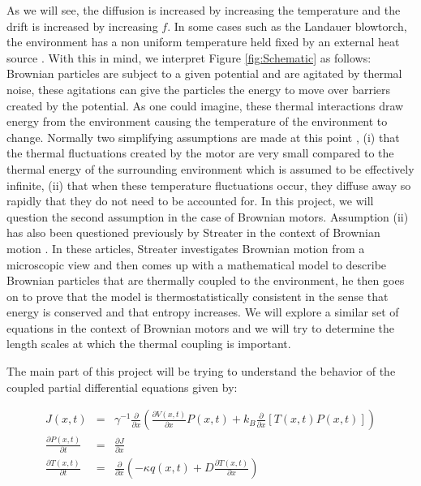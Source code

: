 \documentclass[11pt]{article} %
\begin{document}
As we will see, the diffusion is increased by increasing the temperature and the drift is increased by increasing $f$. In some cases such as the Landauer blowtorch, the environment has a non uniform temperature held fixed by an external heat source \cite{Landauer1988}. With this in mind, we interpret Figure \ref{fig:Schematic} as follows: Brownian particles are subject to a given potential and are agitated by thermal noise, these agitations can give the particles the energy to move over barriers created by the potential. As one could imagine, these thermal interactions draw energy from the environment causing the temperature of the environment to change. Normally two simplifying assumptions are made at this point \cite{Reimann2001}, (i) that the thermal fluctuations created by the motor are very small compared to the thermal energy of the surrounding environment which is assumed to be effectively infinite, (ii) that when these temperature fluctuations occur, they diffuse away so rapidly that they do not need to be accounted for. In this project, we will question the second assumption in the case of Brownian motors. Assumption (ii) has also been questioned previously by Streater in the context of Brownian motion \cite{Streater1997, Streater1997a}. In these articles, Streater investigates Brownian motion from a microscopic view and then comes up with a mathematical model to describe Brownian particles that are thermally coupled to the environment, he then goes on to prove that the model is thermostatistically consistent in the sense that energy is conserved and that entropy increases. We will explore a similar set of equations in the context of Brownian motors and we will try to determine the length scales at which the thermal coupling is important.

The main part of this project will be trying to understand the behavior of the coupled partial differential equations given by:

\begin{eqnarray}
J(x, t) &=& \gamma^{-1} \frac{\partial}{\partial x} \left ( \frac{\partial V(x, t)}{\partial x} P(x, t) + k_B \frac{\partial}{\partial x} \left [T(x, t) P(x, t) \right] \right )  \\
\frac{\partial P(x, t)}{\partial t} &=& \frac{\partial J}{\partial x} \label{eqn:Smoluchowski} \\
\frac{\partial T(x, t)}{\partial t} &=& \frac{\partial}{\partial x} \left ( -\kappa q(x, t) + D \frac{\partial T(x, t)}{\partial x} \right ) \label{eqn:TemperatureEvolution}
\end{eqnarray}
\end{document}
